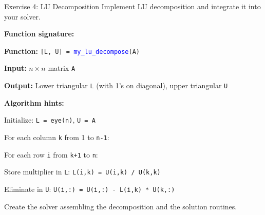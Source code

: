 \documentclass[aspectratio=169]{beamer}
\begin{document}
\begin{frame}{Exercise 4: LU Decomposition}
	\textcolor{NavyBlue}{Implement LU decomposition and integrate it into your solver.}

	\vspace{0.1cm}
	\textbf{Function signature:}
	\begin{itemize}
		\small{
		\item \textbf{Function:} \texttt{[L, U] = \textcolor{blue}{my\_lu\_decompose}(A)}
		\item \textbf{Input:} $n \times n$ matrix \texttt{A}
		\item \textbf{Output:} Lower triangular \texttt{L} (with 1's on diagonal), upper triangular \texttt{U}
		      }
	\end{itemize}

	\vspace{0.1cm}
	\textbf{Algorithm hints:}
	\begin{itemize}
		\small{
		\item Initialize: \texttt{L = eye(n)}, \texttt{U = A}
		\item For each column \texttt{k} from 1 to \texttt{n-1}:
		      }
		      \begin{itemize}
			      \small{
			      \item For each row \texttt{i} from \texttt{k+1} to \texttt{n}:
			      \item Store multiplier in \texttt{L}: \texttt{L(i,k) = U(i,k) / U(k,k)}
			      \item Eliminate in \texttt{U}: \texttt{U(i,:) = U(i,:) - L(i,k) * U(k,:)}
			            }
		      \end{itemize}
		      \small{
		\item Create the solver assembling the decomposition and the solution routines.
		      }
	\end{itemize}
\end{frame}
\end{document}
